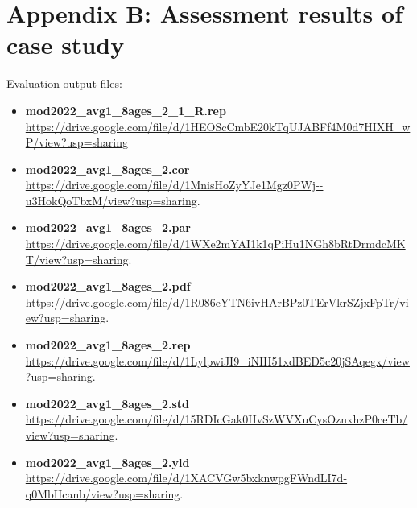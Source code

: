\documentclass{article}
\begin{document}
\section{Appendix B: Assessment results of case study}
\label{section:AppendixB}
Evaluation output files:
\begin{itemize}
    \item \textbf{mod2022\_avg1\_8ages\_2\_1\_R.rep}\\
    \url{https://drive.google.com/file/d/1HEOScCmbE20kTqUJABFf4M0d7HIXH_wP/view?usp=sharing}
    \item \textbf{mod2022\_avg1\_8ages\_2.cor}\\
    \url{https://drive.google.com/file/d/1MnisHoZyYJe1Mgz0PWj--u3HokQoTbxM/view?usp=sharing}.
    \item \textbf{mod2022\_avg1\_8ages\_2.par}\\
    \url{https://drive.google.com/file/d/1WXe2mYAI1k1qPiHu1NGh8bRtDrmdcMKT/view?usp=sharing}.
    \item \textbf{mod2022\_avg1\_8ages\_2.pdf}\\
    \url{https://drive.google.com/file/d/1R086eYTN6ivHArBPz0TErVkrSZjxFpTr/view?usp=sharing}.
    
    \item \textbf{mod2022\_avg1\_8ages\_2.rep}\\
    \url{https://drive.google.com/file/d/1LylpwiJI9_iNIH51xdBED5c20jSAqegx/view?usp=sharing}.
    \item  \textbf{mod2022\_avg1\_8ages\_2.std}\\
    \url{https://drive.google.com/file/d/15RDIcGak0HvSzWVXuCysOznxhzP0ceTb/view?usp=sharing}.
    \item \textbf{mod2022\_avg1\_8ages\_2.yld}\\
    \url{https://drive.google.com/file/d/1XACVGw5bxknwpgFWndLI7d-q0MbHcanb/view?usp=sharing}.
    
\end{itemize}

 
\printbibliography
\end{document}
